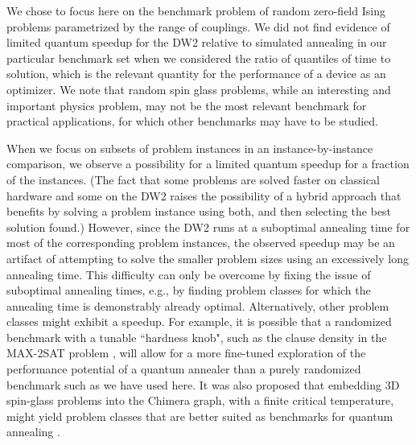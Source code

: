 We chose to focus here on the benchmark problem of random zero-field Ising problems parametrized by the range of couplings.
We did not find evidence of limited quantum speedup for the DW2 relative to simulated annealing in our particular benchmark set when we considered the ratio of quantiles of time to solution, which is the relevant quantity for the performance of a device as an optimizer. We note that random spin glass problems, while an interesting and important physics problem, may not be the most relevant benchmark for practical applications, for which other benchmarks may have to be studied.

When we focus on subsets of problem instances in an instance-by-instance comparison, we observe a possibility for a limited quantum speedup for a fraction of the instances. (The fact that some problems are solved faster on classical hardware and some on the DW2 raises the possibility of a hybrid approach that benefits by solving a problem instance using both, and then selecting the best solution found.) However, since the DW2 runs at a suboptimal annealing time for most of the corresponding problem instances, the observed speedup may be an artifact of attempting to solve the smaller problem sizes using  an excessively long annealing time. This difficulty can only be overcome by fixing the issue of suboptimal annealing times, e.g., by finding problem classes for which the annealing time is demonstrably already optimal.
Alternatively, other problem classes might exhibit a speedup. For example, it is possible that a randomized benchmark with a tunable ``hardness knob", such as the clause density in the MAX-2SAT problem \cite{MAX2SAT}, will allow for a more fine-tuned exploration of the performance potential of a quantum annealer than a purely randomized benchmark such as we have used here. It was also proposed that embedding 3D spin-glass problems into the Chimera graph, with a finite critical temperature, might yield problem classes that are better suited as benchmarks for quantum annealing \cite{2014Katzgraber}.

\clearpage

% 
%

% 
% 

